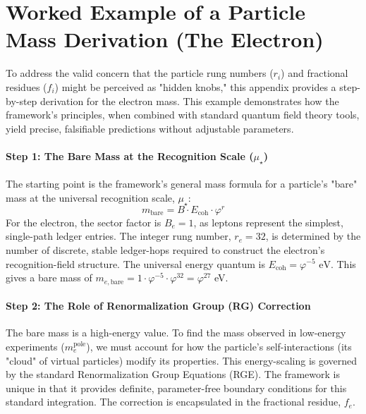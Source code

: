 \section{Worked Example of a Particle Mass Derivation (The Electron)}
\label{app:electron_mass_derivation}

To address the valid concern that the particle rung numbers ($r_i$) and fractional residues ($f_i$) might be perceived as "hidden knobs," this appendix provides a step-by-step derivation for the electron mass. This example demonstrates how the framework's principles, when combined with standard quantum field theory tools, yield precise, falsifiable predictions without adjustable parameters.

\paragraph{Step 1: The Bare Mass at the Recognition Scale ($\mu_\star$)}
The starting point is the framework's general mass formula for a particle's "bare" mass at the universal recognition scale, $\mu_\star$:
\[ m_{\text{bare}} = B \cdot E_{\text{coh}} \cdot \varphi^{r} \]
For the electron, the sector factor is $B_e = 1$, as leptons represent the simplest, single-path ledger entries. The integer rung number, $r_e=32$, is determined by the number of discrete, stable ledger-hops required to construct the electron's recognition-field structure. The universal energy quantum is $E_{\text{coh}} = \varphi^{-5} \text{ eV}$.
This gives a bare mass of $m_{e,\text{bare}} = 1 \cdot \varphi^{-5} \cdot \varphi^{32} = \varphi^{27}$ eV.

\paragraph{Step 2: The Role of Renormalization Group (RG) Correction}
The bare mass is a high-energy value. To find the mass observed in low-energy experiments ($m_e^{\text{pole}}$), we must account for how the particle's self-interactions (its "cloud" of virtual particles) modify its properties. This energy-scaling is governed by the standard Renormalization Group Equations (RGE). The framework is unique in that it provides definite, parameter-free boundary conditions for this standard integration. The correction is encapsulated in the fractional residue, $f_e$.

